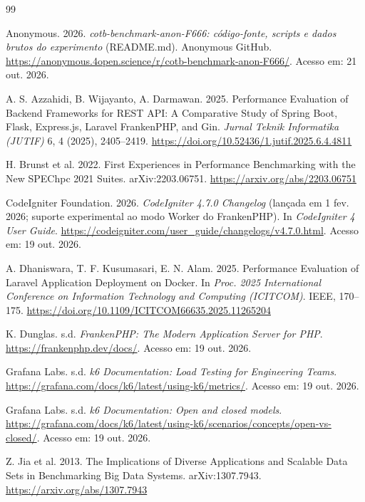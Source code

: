 \documentclass[sigconf, nonacm, screen, anonymous, language=portuguese, language=spanish, language={main=english}]{acmart}
\begin{document}

\begin{thebibliography}{99}

Anonymous. 2026. \textit{cotb-benchmark-anon-F666: código-fonte, \textit{scripts} e dados brutos do experimento} (README.md). Anonymous GitHub. \url{https://anonymous.4open.science/r/cotb-benchmark-anon-F666/}. Acesso em: 21 out. 2026.

A. S. Azzahidi, B. Wijayanto, A. Darmawan. 2025. Performance Evaluation of Backend Frameworks for REST API: A Comparative Study of Spring Boot, Flask, Express.js, Laravel FrankenPHP, and Gin. \textit{Jurnal Teknik Informatika (JUTIF)} 6, 4 (2025), 2405--2419. \url{https://doi.org/10.52436/1.jutif.2025.6.4.4811}

H. Brunst et al. 2022. First Experiences in Performance Benchmarking with the New SPEChpc 2021 Suites. arXiv:2203.06751. \url{https://arxiv.org/abs/2203.06751}

CodeIgniter Foundation. 2026. \textit{CodeIgniter 4.7.0 Changelog} (lançada em 1 fev. 2026; suporte experimental ao modo Worker do FrankenPHP). In \textit{CodeIgniter 4 User Guide}. \url{https://codeigniter.com/user_guide/changelogs/v4.7.0.html}. Acesso em: 19 out. 2026.

A. Dhaniswara, T. F. Kusumasari, E. N. Alam. 2025. Performance Evaluation of Laravel Application Deployment on Docker. In \textit{Proc. 2025 International Conference on Information Technology and Computing (ICITCOM)}. IEEE, 170--175. \url{https://doi.org/10.1109/ICITCOM66635.2025.11265204}

K. Dunglas. s.d. \textit{FrankenPHP: The Modern Application Server for PHP}. \url{https://frankenphp.dev/docs/}. Acesso em: 19 out. 2026.

Grafana Labs. s.d. \textit{k6 Documentation: Load Testing for Engineering Teams}. \url{https://grafana.com/docs/k6/latest/using-k6/metrics/}. Acesso em: 19 out. 2026.

Grafana Labs. s.d. \textit{k6 Documentation: Open and closed models}. \url{https://grafana.com/docs/k6/latest/using-k6/scenarios/concepts/open-vs-closed/}. Acesso em: 19 out. 2026.

Z. Jia et al. 2013. The Implications of Diverse Applications and Scalable Data Sets in Benchmarking Big Data Systems. arXiv:1307.7943. \url{https://arxiv.org/abs/1307.7943}


\end{thebibliography}
\end{document}
